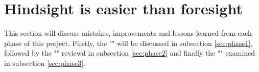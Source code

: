 \section{Hindsight is easier than foresight}
\label{sec:res-discussion}
This section will discuss mistakes, improvements and lessons learned from each phase of this project. %
Firstly,
the "" will be discussed in subsection \ref{sec:phase1}, 
followed by the "" reviewd in subsection \ref{sec:phase2} 
and finally the "" examined in subsection \ref{sec:phase3}.
